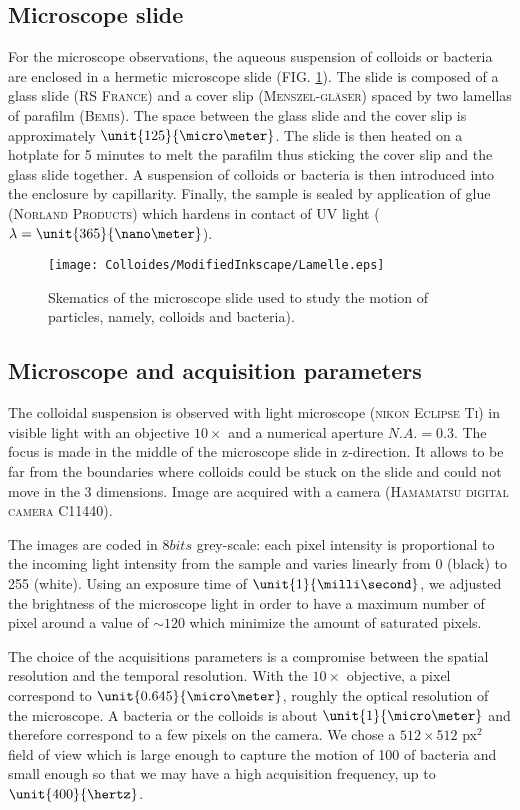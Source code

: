 \documentclass[%
 aip,
 jmp,%
 amsmath,amssymb,
reprint,%
]{revtex4-1}
\begin{document}
\subsection{Microscope slide}
For the microscope observations, the aqueous suspension of colloids or bacteria are enclosed in a hermetic microscope slide (FIG. \ref{Slide}). The  slide is composed of a  glass slide (\textsc{RS France}) and a cover slip (\textsc{Menszel-gl\"aser}) spaced by two lamellas of parafilm (\textsc{Bemis}).  The space between the glass slide and the cover slip is approximately $\unit{125}{\micro\meter}$.  The slide is then heated on a hotplate for 5 minutes to melt the parafilm thus sticking the cover slip and the glass slide together. A suspension of colloids or bacteria is then introduced into the enclosure by capillarity. Finally, the sample is sealed by application of glue (\textsc{Norland Products}) which hardens in contact of UV light ($\lambda = \unit{365}{\nano\meter}$).


\begin{figure}[H]
\centering
\texttt{[image: Colloides/ModifiedInkscape/Lamelle.eps]}
\caption{Skematics of the microscope slide used to study the motion of particles, namely, colloids and bacteria).}
\label{Slide}
\end{figure}

\subsection{Microscope and acquisition parameters}

The colloidal suspension is observed with light microscope (\textsc{nikon Eclipse Ti}) in visible light with an objective $10 \times$ and a numerical aperture $N.A. = 0.3$. The focus is made in the middle of the microscope slide in z-direction. It allows to be far from the boundaries where colloids could be stuck on the slide and could not move in the 3 dimensions. Image are acquired with a camera (\textsc{Hamamatsu digital camera C11440}).

The images are coded in $\unit{8}{bits}$  grey-scale: each pixel intensity is proportional to the incoming light intensity from the sample and varies linearly from  0 (black) to 255 (white). Using an exposure time of $\unit{1}{\milli\second}$, we adjusted the brightness of the microscope light in order to have a maximum number of pixel around a value of $\sim 120$ which minimize the amount of saturated pixels.

The choice of the acquisitions parameters is a compromise between the spatial resolution and the temporal resolution. With the $10\times$ objective, a pixel correspond to $\unit{0.645}{\micro\meter}$, roughly the optical resolution of the microscope. A bacteria or the colloids is about $\unit{1}{\micro\meter}$ and therefore correspond to a few pixels on the camera. We chose a $512 \times 512$ px$^2$ field of view which is large enough to capture the motion of 100 of bacteria and small enough so that we may have a high acquisition frequency, up to $\unit{400}{\hertz}$.
\end{document}

